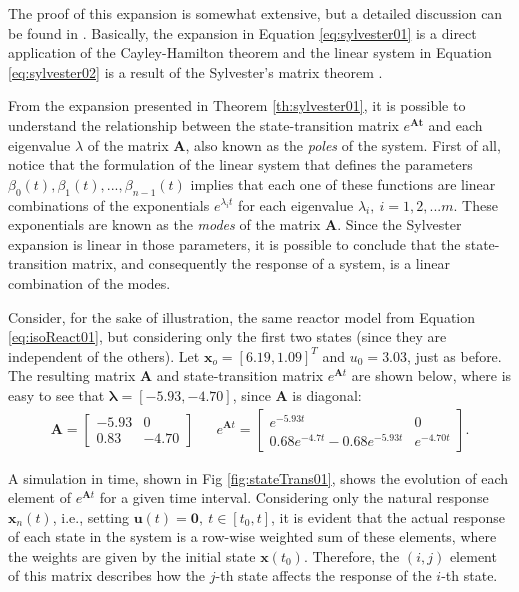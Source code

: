 \documentclass[a4paper,11pt]{book}
\numberwithin{figure}{chapter}
\numberwithin{equation}{chapter}
\numberwithin{table}{chapter}
\theoremstyle{definition}
\begin{document}
The proof of this expansion is somewhat extensive, but a detailed discussion can be found in \cite{Chen:1998}. Basically, the expansion in Equation \eqref{eq:sylvester01} is a direct application of the Cayley-Hamilton theorem \cite{Atiyah:2018} and the linear system in Equation \eqref{eq:sylvester02} is a result of the Sylvester's matrix theorem  \cite{Horn:2012}.

From the expansion presented in Theorem \ref{th:sylvester01}, it is possible to understand the relationship between the state-transition matrix $e^{\bm{At}}$ and each eigenvalue $\lambda$ of the matrix $\bm{A}$, also known as the \textit{poles} of the system. First of all, notice that the formulation of the linear system that defines the parameters $\beta_0(t), \beta_1(t), ..., \beta_{n-1}(t)$ implies that each one of these functions are linear combinations of the exponentials $e^{\lambda_i t}$ for each eigenvalue $\lambda_i,\ i=1,2,...m$. These exponentials are known as the \textit{modes} of the matrix $\bm{A}$. Since the Sylvester expansion is linear in those parameters, it is possible to conclude that the state-transition matrix, and consequently the response of a system, is a linear combination of the modes.

Consider, for the sake of illustration, the same reactor model from Equation \eqref{eq:isoReact01}, but considering only the first two states (since they are independent of the others). Let $\bm{x}_o = [6.19, 1.09]^T$ and $u_0 = 3.03$, just as before. The resulting matrix $\bm{A}$ and state-transition matrix $e^{\bm{A} t}$ are shown below, where is easy to see that $\bm{\lambda} = [-5.93, -4.70]$, since $\bm{A}$ is diagonal:
\begin{align} \label{eq:stateRespEx01}
    \bm{A} = \begin{bmatrix} 
        -5.93  &        0 \\
        0.83   &  -4.70 
    \end{bmatrix} && e^{\bm{A} t} = \begin{bmatrix} 
        e^{-5.93 t}  &        0 \\
        0.68 e^{-4.7 t} - 0.68 e^{-5.93 t}  &  e^{-4.70 t} 
    \end{bmatrix}
.\end{align}

A simulation in time, shown in Fig \ref{fig:stateTrans01}, shows the evolution of each element of $e^{\bm{A} t}$ for a given time interval. Considering only the natural response $\bm{x}_n(t)$, i.e., setting $\bm{u}(t) = \bm{0},\ t \in [t_0, t]$, it is evident that the actual response of each state in the system is a row-wise weighted sum of these elements, where the weights are given by the initial state $\bm{x}(t_0)$. Therefore, the $(i, j)$ element of this matrix describes how the $j$-th state affects the response of the $i$-th state.
\end{document}

